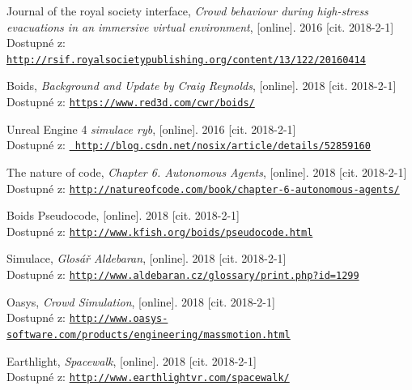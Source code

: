 \documentclass[czech,public,dept460,male,cpdeclaration]{diploma}
\begin{document}
\newpage

\begin{thebibliography}{99}
	
	 Journal of the royal society interface, 
		\textit{Crowd behaviour during high-stress evacuations in an immersive virtual environment}, [online]. 2016 [cit. 2018-2-1]\\
		Dostupné z: \href{http://rsif.royalsocietypublishing.org/content/13/122/20160414}{\texttt{http://rsif.royalsocietypublishing.org/content/13/122/20160414}}
	
	 Boids, 
		\textit{Background and Update by Craig Reynolds}, [online]. 2018 [cit. 2018-2-1]\\
		Dostupné z: \href{https://www.red3d.com/cwr/boids/}{\texttt{https://www.red3d.com/cwr/boids/}}
	
	 Unreal Engine 4 \textit{simulace ryb}, [online]. 2016 [cit. 2018-2-1]\\
		Dostupné z: \href{		http://blog.csdn.net/nosix/article/details/52859160}{\texttt{		http://blog.csdn.net/nosix/article/details/52859160}}
	
	 The nature of code, 
		\textit{Chapter 6. Autonomous Agents}, [online]. 2018 [cit. 2018-2-1]\\
		Dostupné z: \href{http://natureofcode.com/book/chapter-6-autonomous-agents/}{\texttt{http://natureofcode.com/book/chapter-6-autonomous-agents/}}

	 Boids Pseudocode, 
		[online]. 2018 [cit. 2018-2-1]\\
		Dostupné z: \href{http://www.kfish.org/boids/pseudocode.html}{\texttt{http://www.kfish.org/boids/pseudocode.html}}
		
	 Simulace,
		\textit{Glosář Aldebaran}, [online]. 2018 [cit. 2018-2-1]\\
		Dostupné z: \href{http://www.aldebaran.cz/glossary/print.php?id=1299}{\texttt{http://www.aldebaran.cz/glossary/print.php?id=1299}}
		
	 Oasys,
		\textit{Crowd Simulation}, [online]. 2018 [cit. 2018-2-1]\\
		Dostupné z: \href{http://www.oasys-software.com/products/engineering/massmotion.html}{\texttt{http://www.oasys-software.com/products/engineering/massmotion.html}}
		
	 Earthlight,
		\textit{Spacewalk}, [online]. 2018 [cit. 2018-2-1]\\
		Dostupné z: \href{http://www.earthlightvr.com/spacewalk/}{\texttt{http://www.earthlightvr.com/spacewalk/}}
		

\end{thebibliography}
\end{document}

